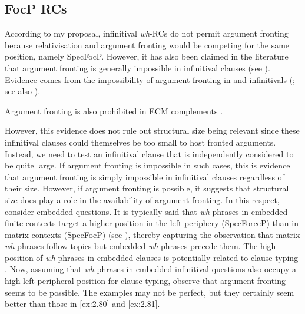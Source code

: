 \documentclass[output=paper]{langsci/langscibook}
\begin{document}
\subsection{FocP RCs}

According to my proposal, infinitival
\emph{wh}{-\glspl{RC} do not permit argument fronting because relativisation
and argument fronting} would be competing for the same position, namely
SpecFocP\@. However, it has also been claimed in the literature that argument
fronting is generally impossible in infinitival clauses (see
\citealt[206--208]{Bianchi1999}). Evidence comes from the impossibility of
argument fronting in  and  infinitivals
(\citealt[67--68]{Haegeman2012}; see also
\citealt[484--485]{HooperThompson1973}).

\ea\label{ex:2.80} \textcite[485]{HooperThompson1973}
    \z
\z
Argument fronting is also prohibited in \gls{ECM} complements \parencite[Ch.\ 2, note 20]{Haegeman2012}.

\ea\label{ex:2.81} \textcite[297, fn.\ 14]{CulicoverLevine2001}
    \z
\z
However, this evidence does not rule out structural size being relevant since
these infinitival clauses could themselves be too small to host fronted
arguments. Instead, we need to test an infinitival clause that is independently
considered to be quite large. If argument fronting is impossible in such cases,
this is evidence that argument fronting is simply impossible in infinitival
clauses regardless of their size. However, if argument fronting is possible, it
suggests that structural size does play a role in the availability of argument
fronting. In this respect, consider embedded questions. It is typically said
that \emph{wh}{-phrases in embedded} finite contexts target a higher
position in the left periphery (SpecForceP) than in matrix contexts (SpecFocP)
(see \citealt{Haegeman2012,Pesetsky1995}), thereby capturing the observation
that matrix \emph{wh}{-phrases follow topics but embedded} \emph{wh}{-phrases
precede them. The high position of} \emph{wh}{-phrases in embedded clauses is}
potentially related to clause-typing \citep{Cheng1991}. Now, assuming that
\emph{wh}-phrases in embedded infinitival questions also occupy a high left
peripheral position for clause-typing, observe that argument fronting seems to
be possible. The examples may not be perfect, but they certainly seem better
than those in \eqref{ex:2.80} and \eqref{ex:2.81}.\largerpage
\end{document}
